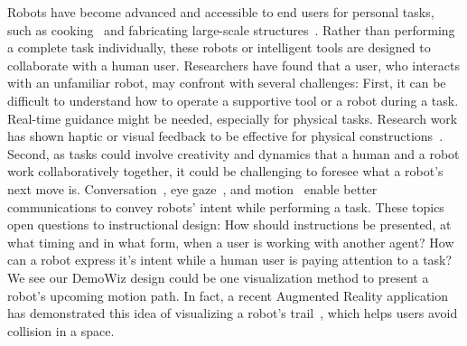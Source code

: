 Robots have become advanced and accessible to end users for personal tasks, such as cooking~\cite{Cha:2015:RHQ:2696454.2696465} and fabricating large-scale structures~\cite{Vasey:2016:HHR:2897839.2927404}. Rather than performing a complete task individually, these robots or intelligent tools are designed to collaborate with a human user. Researchers have found that a user, who interacts with an unfamiliar robot, may confront with several challenges:
%
First, it can be difficult to understand how to operate a supportive tool or a robot during a task. Real-time guidance might be needed, especially for physical tasks. Research work has shown haptic or visual feedback to be effective for physical constructions~\cite{Agrawal:2015:PPS:2807442.2807505,Zoran:2013:FFD:2470654.2481361,Schoop:2016:DSS:2851581.2892429}.
%
Second, as tasks could involve creativity and dynamics that a human and a robot work collaboratively together, it could be challenging to foresee what a robot's next move is. Conversation~\cite{ChaoSimonSays11}, eye gaze~\cite{Andrist:2014:CGA:2559636.2559666}, and motion~\cite{Dragan:2015:ERM:2696454.2696473,Szafir:2014:CIA:2559636.2559672} enable better communications to convey robots' intent while performing a task.
%
These topics open questions to instructional design:
How should instructions be presented, at what timing and in what form, when a user is working with another agent? How can a robot express it's intent while a human user is paying attention to a task?
%
We see our DemoWiz design could be one visualization method to present a robot's upcoming motion path. In fact, a recent Augmented Reality application has demonstrated this idea of visualizing a robot's trail~\cite{HoloLensRobot}, which helps users avoid collision in a space.

